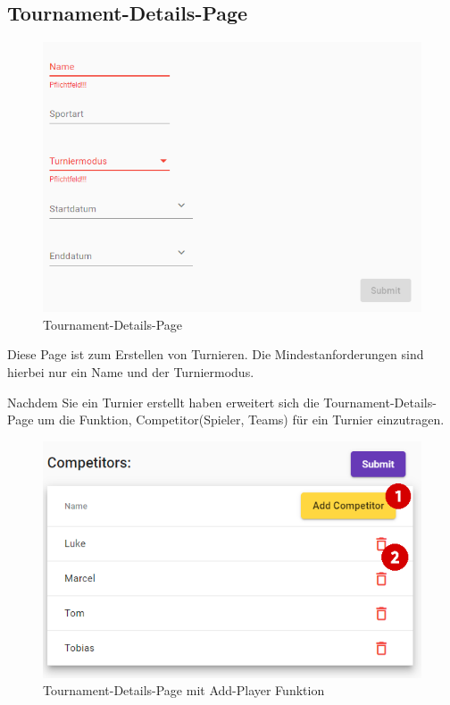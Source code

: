 \subsection{Tournament-Details-Page}
\begin{figure}[H]
    \includegraphics[scale=0.6]{pics/user-guide/tournament-create-page.PNG}
    \caption{Tournament-Details-Page}
\end{figure}

Diese Page ist zum Erstellen von Turnieren. Die Mindestanforderungen
sind hierbei nur ein Name und der Turniermodus.

Nachdem Sie ein Turnier erstellt haben erweitert sich die Tournament-Details-Page um die Funktion, Competitor(Spieler, Teams) für ein Turnier einzutragen.

\begin{figure}[H]
    \includegraphics[scale=0.5]{pics/user-guide/tournament-add-player.PNG}
    \caption{Tournament-Details-Page mit Add-Player Funktion}
\end{figure}

